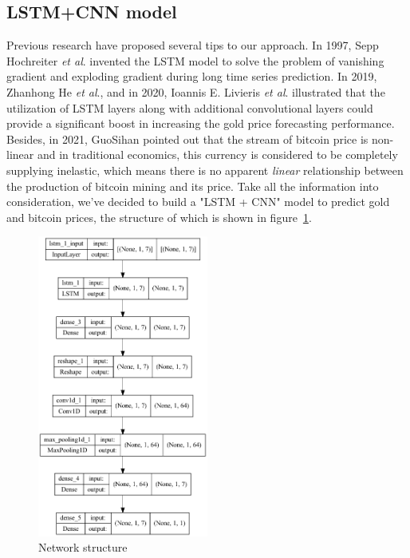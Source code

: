 \documentclass{mcmthesis}
\begin{document}
\subsection{ LSTM+CNN model}
 Previous research have proposed several tips to our approach. In 1997, Sepp Hochreiter \emph{et al}. \cite{1} invented the LSTM model to solve the problem of vanishing gradient and  exploding gradient during long time series prediction. In 2019, Zhanhong He \emph{et al}.\cite{2}, and in 2020, Ioannis E. Livieris \emph{et al}.\cite{3} illustrated that the utilization of LSTM layers along with additional convolutional layers could provide a significant boost in increasing the gold price forecasting performance. Besides, in 2021, GuoSihan \cite{4} pointed out that the stream of bitcoin price is non-linear and in traditional economics, this currency is considered to be completely supplying inelastic, which means there is no apparent \emph{linear} relationship between the production of bitcoin mining and its price. Take all the information into consideration, we've decided to build a "LSTM + CNN" model to predict gold and bitcoin prices, the structure of which is shown in figure~\ref{fig:network structure}.

\begin{figure}[htb]
    \centering
    \includegraphics[width = 0.5\textwidth]{fig/network structure.png} 
    \caption{Network structure}
    \label{fig:network structure}
\end{figure}
\end{document}
